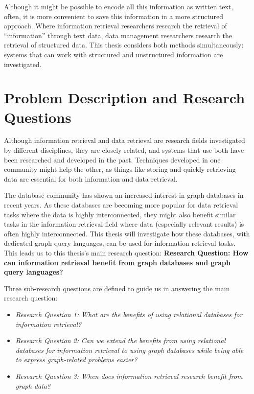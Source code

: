 Although it might be possible to encode all this information as written text, often, it is more convenient to save this information in a more structured approach. Where information retrieval researchers research the retrieval of ``information'' through text data, data management researchers research the retrieval of structured data. This thesis considers both methods simultaneously: systems that can work with structured and unstructured information are investigated.

\section{Problem Description and Research Questions}
Although information retrieval and data retrieval are research fields investigated by different disciplines, they are closely related, and systems that use both have been researched and developed in the past. Techniques developed in one community might help the other, as things like storing and quickly retrieving data are essential for both information and data retrieval. 

The database community has shown an increased interest in graph databases in recent years. As these databases are becoming more popular for data retrieval tasks where the data is highly interconnected, they might also benefit similar tasks in the information retrieval field where data (especially relevant results) is often highly interconnected. This thesis will investigate how these databases, with dedicated graph query languages, can be used for information retrieval tasks. This leads us to this thesis's main research question: \textbf{Research Question: How can information retrieval benefit from graph databases and graph query languages?}

Three sub-research questions are defined to guide us in answering the main research question:

\begin{itemize}
	\item \emph{Research Question 1: What are the benefits of using relational databases for information retrieval?} 
	\item \emph{Research Question 2: Can we extend the benefits from using relational databases for information retrieval to using graph databases while being able to express graph-related problems easier?}  
	\item \emph{Research Question 3: When does information retrieval research benefit from graph data?} 
\end{itemize}

